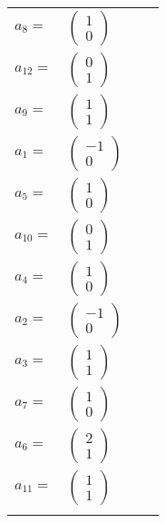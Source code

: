 \documentclass[1p]{elsarticle_modified}
\theoremstyle{definition}
\begin{document}
\begin{tabular}{m{7pt} m{180pt} m{7pt} m{180pt} }
\flushright $a_{8}=$&$\begin{pmatrix}1\\0\end{pmatrix}$ \\
\flushright $a_{12}=$&$\begin{pmatrix}0\\1\end{pmatrix}$ \\
\flushright $a_{9}=$&$\begin{pmatrix}1\\1\end{pmatrix}$ \\
\flushright $a_{1}=$&$\begin{pmatrix}-1\\0\end{pmatrix}$ \\
\flushright $a_{5}=$&$\begin{pmatrix}1\\0\end{pmatrix}$ \\
\flushright $a_{10}=$&$\begin{pmatrix}0\\1\end{pmatrix}$ \\
\flushright $a_{4}=$&$\begin{pmatrix}1\\0\end{pmatrix}$ \\
\flushright $a_{2}=$&$\begin{pmatrix}-1\\0\end{pmatrix}$ \\
\flushright $a_{3}=$&$\begin{pmatrix}1\\1\end{pmatrix}$ \\
\flushright $a_{7}=$&$\begin{pmatrix}1\\0\end{pmatrix}$ \\
\flushright $a_{6}=$&$\begin{pmatrix}2\\1\end{pmatrix}$ \\
\flushright $a_{11}=$&$\begin{pmatrix}1\\1\end{pmatrix}$\\&\end{tabular}
\end{document}
